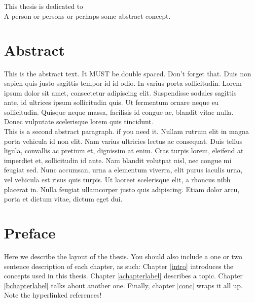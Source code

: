 \documentclass[12pt, letterpaper]{report}
\renewcommand{\baselinestretch}{1.33}
\numberwithin{equation}{section}
\begin{document}
	
 	\newpage 
	\chapter*{}
	\thispagestyle{empty}
	This thesis is dedicated to\\
	A person or persons or perhaps some abstract concept.

	\newpage 
	\chapter*{Abstract}
	\thispagestyle{empty}
	\vspace*{-0.7in}
	\renewcommand{\baselinestretch}{1.8}
	\normalsize{
	This is the abstract text. It MUST be double spaced. Don't forget that. Duis non sapien quis justo sagittis tempor id id odio. In varius porta sollicitudin. Lorem ipsum dolor sit amet, consectetur adipiscing elit. Suspendisse sodales sagittis ante, id ultrices ipsum sollicitudin quis. Ut fermentum ornare neque eu sollicitudin. Quisque neque massa, facilisis id congue ac, blandit vitae nulla. Donec vulputate scelerisque lorem quis tincidunt.
	} \vspace*{-0.2in} \\
	
	\normalsize{
	This is a second abstract paragraph. if you need it. Nullam rutrum elit in magna porta vehicula id non elit. Nam varius ultricies lectus ac consequat. Duis tellus ligula, convallis ac pretium et, dignissim at enim. Cras turpis lorem, eleifend at imperdiet et, sollicitudin id ante. Nam blandit volutpat nisl, nec congue mi feugiat sed. Nunc accumsan, urna a elementum viverra, elit purus iaculis urna, vel vehicula est risus quis turpis. Ut laoreet scelerisque elit, a rhoncus nibh placerat in. Nulla feugiat ullamcorper justo quis adipiscing. Etiam dolor arcu, porta et dictum vitae, dictum eget dui.
	}
	\renewcommand{\baselinestretch}{1.33}
	
	\newpage 
	\chapter*{Preface}
	\thispagestyle{empty}
	\vspace*{-0.7in}
	Here we describe the layout of the thesis.  You should also include a one or two sentence description of each chapter, as such: Chapter \ref{intro} introduces the concepts used in this thesis. Chapter \ref{achapterlabel} describes a topic. Chapter \ref{bchapterlabel} talks about another one. Finally, chapter \ref{conc} wraps it all up. Note the hyperlinked references!
	
\end{document}
